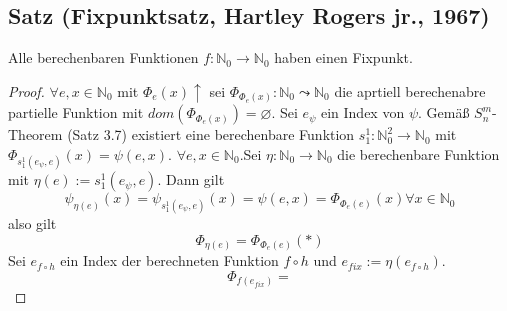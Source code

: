   \subsection{Satz (Fixpunktsatz, Hartley Rogers jr., 1967)} Alle berechenbaren Funktionen $f : \mathbb{N}_0 \to \mathbb{N}_0$ haben einen Fixpunkt.
  \begin{proof}
    $\forall e, x \in \mathbb{N}_0$ mit $\Phi_e(x) \uparrow$ sei $\Phi_{\Phi_e(x)} : \mathbb{N}_0 \leadsto \mathbb{N}_0$ die aprtiell berechenabre partielle Funktion mit $dom(\Phi_{\Phi_e(x)}) = \varnothing$. Sei $e_{\psi}$ ein Index von $\psi$. Gemäß $S_n^m$-Theorem (Satz 3.7) existiert eine berechenbare Funktion $s_1^1 : \mathbb{N}_0^2 \to \mathbb{N}_0$ mit $\Phi_{s_1^1(e_{\psi}, e)}(x) = \psi(e, x)$. $\forall e, x \in \mathbb{N}_0$.Sei $\eta : \mathbb{N}_0 \to \mathbb{N}_0$ die berechenbare Funktion mit $\eta (e) := s_1^1(e_{\psi}, e)$. Dann gilt \[\psi_{\eta(e)}(x) = \psi_{s_1^1(e_{\psi}, e)}(x) = \psi(e, x) = \Phi_{\Phi_e(e)}(x) \forall x \in \mathbb{N}_0\] also gilt \[\Phi_{\eta(e)} = \Phi_{\Phi_e (e)} (*)\] Sei $e_{f \circ h}$ ein Index der berechneten Funktion $f \circ h$ und $e_{fix} := \eta(e_{f\circ h})$. \[ \Phi_{f(e_{fix})} =\]
  \end{proof}